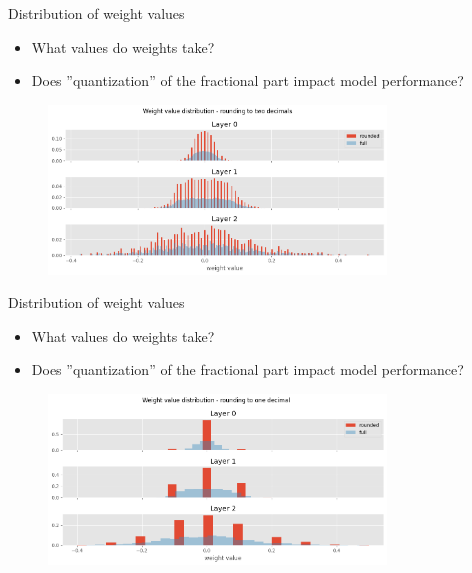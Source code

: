 \documentclass[aspectratio=169]{beamer} %
\begin{document}
\begin{frame}{Distribution of weight values}
  \begin{itemize}
    \item What values do weights take?
    \item Does ''quantization'' of the fractional part impact model performance?
  \end{itemize}

  \begin{figure}
    \centering  
    \includegraphics[width=0.8\textwidth]{figures/118_dist2.png}
  \end{figure}
\end{frame}

\begin{frame}{Distribution of weight values}
  \begin{itemize}
    \item What values do weights take?
    \item Does ''quantization'' of the fractional part impact model performance?
  \end{itemize}

  \begin{figure}
    \centering  
    \includegraphics[width=0.8\textwidth]{figures/118_dist1.png}
  \end{figure}
\end{frame}
\end{document}
